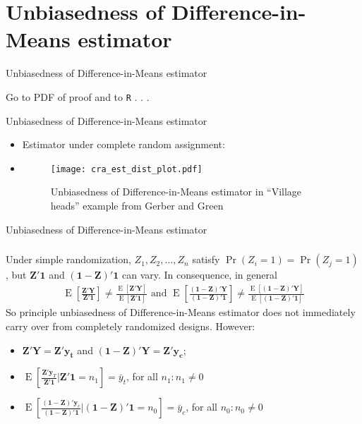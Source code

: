 \documentclass[table, xcolor={dvipsnames}, 9pt]{beamer}
\theoremstyle{newstyle}
\DeclareMathOperator{\E}{\mathrm{E}}
\begin{document}
\section{Unbiasedness of Difference-in-Means estimator}
\begin{frame}{Unbiasedness of Difference-in-Means estimator}

\begin{center}
Go to PDF of proof and to \texttt{R} . . . 
\end{center}
\end{frame}
\begin{frame}{Unbiasedness of Difference-in-Means estimator}
\begin{itemize}
\item Estimator under complete random assignment:
\item[] 
\begin{figure}[H]
\texttt{[image: cra\_est\_dist\_plot.pdf]}
\caption{Unbiasedness of Difference-in-Means estimator in ``Village heads'' example from Gerber and Green}
\end{figure}
\end{itemize}
\end{frame}
\begin{frame}{Unbiasedness of Difference-in-Means estimator}
\frametitle{}
Under simple randomization, $Z_{1}, Z_{2}, \ldots, Z_{n}$ satisfy
$\Pr(Z_{i} =1) = \Pr(Z_{j} = 1)$, but $\mathbf{Z}'\mathbf{1}$ and $\left(\mathbf{1} - \mathbf{Z}\right)'\mathbf{1}$ can vary. In consequence, in general
\begin{align*}
\E\left[\frac{\mathbf{Z}'\mathbf{Y}}{\mathbf{Z}'\mathbf{1}} \right] \neq
\frac{\E[ \mathbf{Z}'\mathbf{Y} ]}{\E[ \mathbf{Z}'\mathbf{1} ]} \text{ and } \E\left[\frac{\left(\mathbf{1} - \mathbf{Z}\right)'\mathbf{Y}}{\left(\mathbf{1} - \mathbf{Z}\right)'\mathbf{1}} \right] \neq
\frac{\E[ \left(\mathbf{1} - \mathbf{Z}\right)'\mathbf{Y} ]}{\E[ \left(\mathbf{1} - \mathbf{Z}\right)'\mathbf{1} ]}
\end{align*}
 So principle unbiasedness of Difference-in-Means estimator does not
 immediately carry over from completely randomized designs.
\pause
However:
  \begin{itemize}
  \item $\mathbf{Z}'\mathbf{Y} = \mathbf{Z}'\mathbf{y_t}$ and $\left(\mathbf{1} - \mathbf{Z}\right)'\mathbf{Y} = \mathbf{Z}'\mathbf{y_c}$;
\item $\E\left[\frac{\mathbf{Z}'\mathbf{y}_{T}}{\mathbf{Z}'\mathbf{1}}\big | \mathbf{Z}'\mathbf{1} =n_{1}\right] = \bar{y}_t$, for all $n_1: n_{1} \neq 0$
\item $\E\left[\frac{\left(\mathbf{1} - \mathbf{Z}\right)'\mathbf{y}_{c}}{\left(\mathbf{1} - \mathbf{Z}\right)'\mathbf{1}}\big | \left(\mathbf{1} - \mathbf{Z}\right)'\mathbf{1} = n_{0}\right] = \bar{y}_c$, for all $n_0: n_{0} \neq 0$
  \end{itemize}


\end{frame}
\end{document}
